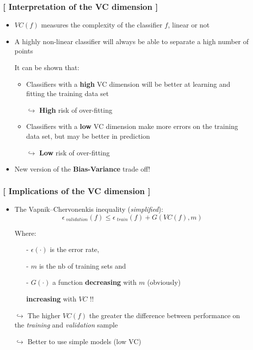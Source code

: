 \documentclass[xcolor=x11names,compress]{beamer}
\renewcommand{\(}{\begin{columns}}
\renewcommand{\)}{\end{columns}}
\newcommand{\<}[1]{\begin{column}{#1}}
\renewcommand{\>}{\end{column}}
\begin{document}
\begin{frame} %
\frametitle{\textcolor{brique}{[ Interpretation of the VC dimension ]}}
\pause
\begin{itemize}[<+->]
    \item $VC(f)$  measures the complexity of the classifier $f$, linear or not
    \item A highly non-linear classifier will always be able to separate a high number of points
    \item[] It can be shown that:
    \begin{itemize}[<+->]
    \item Classifiers with a \textbf{high} VC dimension will be better at learning and fitting the training data set
    \item[$\hookrightarrow$]  \textbf{High} risk of over-fitting
    \item Classifiers with a \textbf{low} VC dimension make more errors on the training data set, but may be better in prediction
    \item[$\hookrightarrow$]  \textbf{Low} risk of over-fitting
    \end{itemize}
\item New version of the \textbf{Bias-Variance} trade off!
\end{itemize}
\end{frame}

\begin{frame} %
\frametitle{\textcolor{brique}{[ Implications of the VC dimension ]}}
\pause
\begin{itemize}[<+->]
    \item The  Vapnik–Chervonenkis inequality (\emph{simplified}):
    $$
        \epsilon_{\;validation}(f)  \leq   \epsilon_{\;train}(f)  + G( VC(f) , m)
    $$
    \item[] Where:
    \begin{itemize}[<+->]
        \item[-] $\epsilon(\cdot)$ is the error rate,
        \item[-] $m$ is the nb of training sets and
        \item[-]  $G(\cdot)$  a function \textbf{decreasing }with  $m$ (obviously)  %
        \item[]  \hspace{2.45cm}  \textbf{increasing} with $VC$ !! %
    \end{itemize}
    \item[$\hookrightarrow$] The higher $VC(f)$ the greater the difference between performance on the \textit{training} and \textit{validation} sample
    \item[$\hookrightarrow$] Better to use simple models (low VC)
\end{itemize}
\end{frame}
\end{document}
